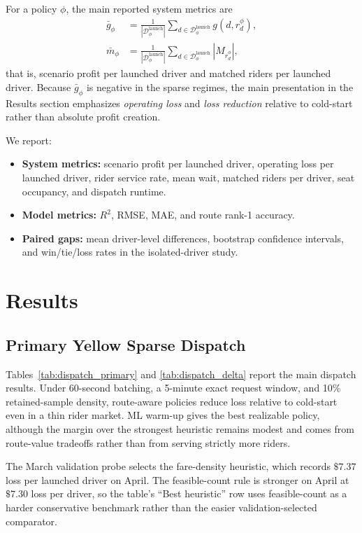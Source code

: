 \documentclass[journal]{IEEEtran}
\begin{document}
For a policy \(\phi\), the main reported system metrics are
\begin{equation}
\begin{aligned}
\bar g_\phi &= \frac{1}{|\mathcal{D}_\phi^{\mathrm{launch}}|}
\sum_{d \in \mathcal{D}_\phi^{\mathrm{launch}}} g(d,r_d^\phi),\\
\bar m_\phi &= \frac{1}{|\mathcal{D}_\phi^{\mathrm{launch}}|}
\sum_{d \in \mathcal{D}_\phi^{\mathrm{launch}}} |M_{r_d^\phi}|,
\end{aligned}
\end{equation}
that is, scenario profit per launched driver and matched riders per launched driver. Because \(\bar g_\phi\) is negative in the sparse regimes, the main presentation in the Results section emphasizes \emph{operating loss} and \emph{loss reduction} relative to cold-start rather than absolute profit creation.

We report:
\begin{itemize}
    \item \textbf{System metrics:} scenario profit per launched driver, operating loss per launched driver, rider service rate, mean wait, matched riders per driver, seat occupancy, and dispatch runtime.
    \item \textbf{Model metrics:} \(R^2\), RMSE, MAE, and route rank-1 accuracy.
    \item \textbf{Paired gaps:} mean driver-level differences, bootstrap confidence intervals, and win/tie/loss rates in the isolated-driver study.
\end{itemize}

\section{Results}
\subsection{Primary Yellow Sparse Dispatch}
Tables~\ref{tab:dispatch_primary} and \ref{tab:dispatch_delta} report the main dispatch results. Under 60-second batching, a 5-minute exact request window, and 10\% retained-sample density, route-aware policies reduce loss relative to cold-start even in a thin rider market. ML warm-up gives the best realizable policy, although the margin over the strongest heuristic remains modest and comes from route-value tradeoffs rather than from serving strictly more riders.

The March validation probe selects the fare-density heuristic, which records \(\$7.37\) loss per launched driver on April. The feasible-count rule is stronger on April at \(\$7.30\) loss per driver, so the table's ``Best heuristic'' row uses feasible-count as a harder conservative benchmark rather than the easier validation-selected comparator.
\end{document}
